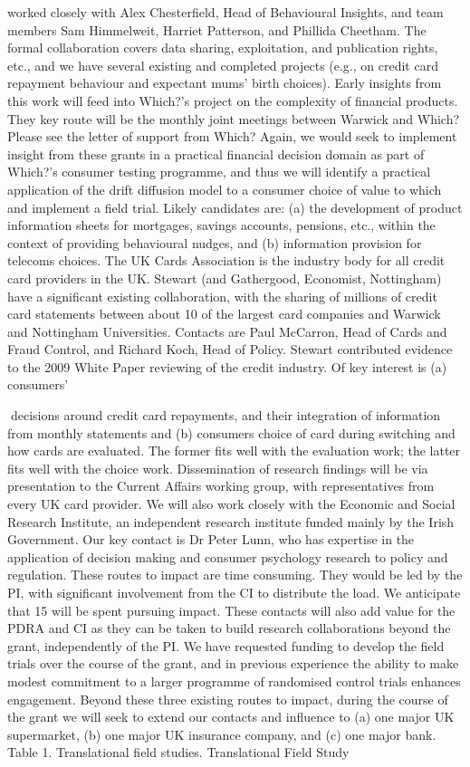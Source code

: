 worked closely with Alex Chesterfield, Head of Behavioural Insights, and team members
Sam Himmelweit, Harriet Patterson, and Phillida Cheetham. The formal collaboration covers
data sharing, exploitation, and publication rights, etc., and we have several existing and
completed projects (e.g., on credit card repayment behaviour and expectant mums’ birth
choices). Early insights from this work will feed into Which?’s project on the complexity of
financial products. They key route will be the monthly joint meetings between Warwick and
Which? Please see the letter of support from Which? Again, we would seek to implement
insight from these grants in a practical financial decision domain as part of Which?’s
consumer testing programme, and thus we will identify a practical application of the drift
diffusion model to a consumer choice of value to which and implement a field trial. Likely
candidates are: (a) the development of product information sheets for mortgages, savings
accounts, pensions, etc., within the context of providing behavioural nudges, and (b)
information provision for telecoms choices.
The UK Cards Association is the industry body for all credit card providers in the UK.
Stewart (and Gathergood, Economist, Nottingham) have a significant existing collaboration,
with the sharing of millions of credit card statements between about 10 of the largest card
companies and Warwick and Nottingham Universities. Contacts are Paul McCarron, Head of
Cards and Fraud Control, and Richard Koch, Head of Policy. Stewart contributed evidence to
the 2009 White Paper reviewing of the credit industry. Of key interest is (a) consumers’

decisions around credit card repayments, and their integration of information from monthly
statements and (b) consumers choice of card during switching and how cards are evaluated.
The former fits well with the evaluation work; the latter fits well with the choice work.
Dissemination of research findings will be via presentation to the Current Affairs working
group, with representatives from every UK card provider.
We will also work closely with the Economic and Social Research Institute, an independent
research institute funded mainly by the Irish Government. Our key contact is Dr Peter Lunn,
who has expertise in the application of decision making and consumer psychology research to
policy and regulation.
These routes to impact are time consuming. They would be led by the PI, with significant
involvement from the CI to distribute the load. We anticipate that 15%
will be spent pursuing impact. These contacts will also add value for the PDRA and CI as
they can be taken to build research collaborations beyond the grant, independently of the PI.
We have requested funding to develop the field trials over the course of the grant, and in
previous experience the ability to make modest commitment to a larger programme of
randomised control trials enhances engagement.
Beyond these three existing routes to impact, during the course of the grant we will seek to
extend our contacts and influence to (a) one major UK supermarket, (b) one major UK
insurance company, and (c) one major bank.
Table 1. Translational field studies.
Translational Field Study


